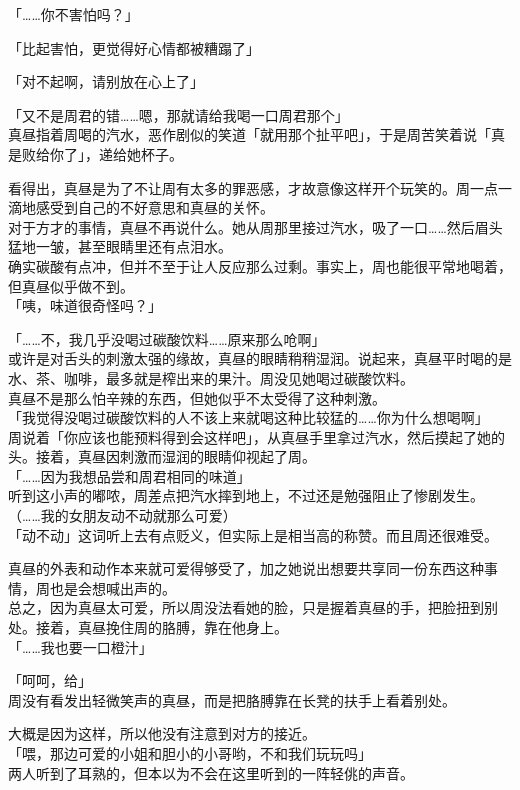 「……你不害怕吗？」

「比起害怕，更觉得好心情都被糟蹋了」

「对不起啊，请别放在心上了」

「又不是周君的错……嗯，那就请给我喝一口周君那个」\\

真昼指着周喝的汽水，恶作剧似的笑道「就用那个扯平吧」，于是周苦笑着说「真是败给你了」，递给她杯子。

看得出，真昼是为了不让周有太多的罪恶感，才故意像这样开个玩笑的。周一点一滴地感受到自己的不好意思和真昼的关怀。\\

对于方才的事情，真昼不再说什么。她从周那里接过汽水，吸了一口……然后眉头猛地一皱，甚至眼睛里还有点泪水。\\

确实碳酸有点冲，但并不至于让人反应那么过剩。事实上，周也能很平常地喝着，但真昼似乎做不到。\\

「咦，味道很奇怪吗？」

「……不，我几乎没喝过碳酸饮料……原来那么呛啊」\\

或许是对舌头的刺激太强的缘故，真昼的眼睛稍稍湿润。说起来，真昼平时喝的是水、茶、咖啡，最多就是榨出来的果汁。周没见她喝过碳酸饮料。\\

真昼不是那么怕辛辣的东西，但她似乎不太受得了这种刺激。\\

「我觉得没喝过碳酸饮料的人不该上来就喝这种比较猛的……你为什么想喝啊」\\

周说着「你应该也能预料得到会这样吧」，从真昼手里拿过汽水，然后摸起了她的头。接着，真昼因刺激而湿润的眼睛仰视起了周。\\

「……因为我想品尝和周君相同的味道」\\

听到这小声的嘟哝，周差点把汽水摔到地上，不过还是勉强阻止了惨剧发生。\\

（……我的女朋友动不动就那么可爱）\\

「动不动」这词听上去有点贬义，但实际上是相当高的称赞。而且周还很难受。

真昼的外表和动作本来就可爱得够受了，加之她说出想要共享同一份东西这种事情，周也是会想喊出声的。\\

总之，因为真昼太可爱，所以周没法看她的脸，只是握着真昼的手，把脸扭到别处。接着，真昼挽住周的胳膊，靠在他身上。\\

「……我也要一口橙汁」

「呵呵，给」\\

周没有看发出轻微笑声的真昼，而是把胳膊靠在长凳的扶手上看着别处。

大概是因为这样，所以他没有注意到对方的接近。\\

「喂，那边可爱的小姐和胆小的小哥哟，不和我们玩玩吗」\\

两人听到了耳熟的，但本以为不会在这里听到的一阵轻佻的声音。
